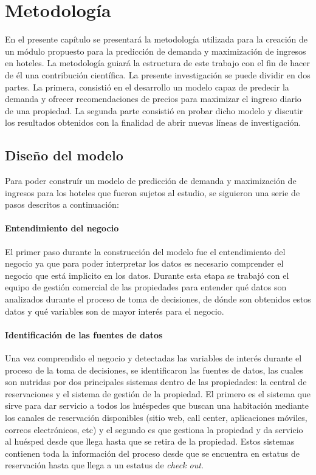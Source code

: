 \chapter{Metodología}
\label{ch:metodologia}

En el presente capítulo se presentará la metodología utilizada para la creación de un módulo propuesto para la predicción de demanda y maximización de ingresos en hoteles. La metodología guiará la estructura de este trabajo con el fin de hacer de él una contribución científica. La presente investigación se puede dividir en dos partes. La primera, consistió en el desarrollo un modelo capaz de predecir la demanda y ofrecer recomendaciones de precios para maximizar el ingreso diario de una propiedad. La segunda parte consistió en probar dicho modelo y discutir los resultados obtenidos con la finalidad de abrir nuevas líneas de investigación.

\section*{Diseño del modelo}

Para poder construír un modelo de predicción de demanda y maximización de ingresos para los hoteles que fueron sujetos al estudio, se siguieron una serie de pasos descritos a continuación:

\subsubsection*{Entendimiento del negocio}

El primer paso durante la construcción del modelo fue el entendimiento del negocio ya que para poder interpretar los datos es necesario comprender el negocio que está implicito en los datos. Durante esta etapa se trabajó con el equipo de gestión comercial de las propiedades para entender qué datos son analizados durante el proceso de toma de decisiones, de dónde son obtenidos estos datos y qué variables son de mayor interés para el negocio.

\subsubsection*{Identificación de las fuentes de datos}

Una vez comprendido el negocio y detectadas las variables de interés durante el proceso de la toma de decisiones, se identificaron las fuentes de datos, las cuales son nutridas por dos principales sistemas dentro de las propiedades: la central de reservaciones y el sistema de gestión de la propiedad. El primero es el sistema que sirve para dar servicio a todos los huéspedes que buscan una habitación mediante los canales de reservación disponibles (sitio web, call center, aplicaciones móviles, correos electrónicos, etc) y el segundo es que gestiona la propiedad y da servicio al huésped desde que llega hasta que se retira de la propiedad. Estos sistemas contienen toda la información del proceso desde que se encuentra en estatus de reservación hasta que llega a un estatus de \emph{check out}.

